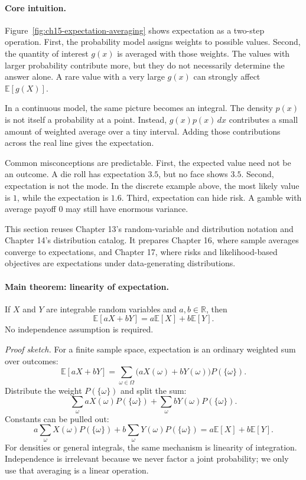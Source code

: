 \paragraph{Core intuition.}
Figure~\ref{fig:ch15-expectation-averaging} shows expectation as a two-step operation. First, the probability model assigns weights to possible values. Second, the quantity of interest \(g(x)\) is averaged with those weights. The values with larger probability contribute more, but they do not necessarily determine the answer alone. A rare value with a very large \(g(x)\) can strongly affect \(\mathbb{E}[g(X)]\).

In a continuous model, the same picture becomes an integral. The density \(p(x)\) is not itself a probability at a point. Instead, \(g(x)p(x)\,dx\) contributes a small amount of weighted average over a tiny interval. Adding those contributions across the real line gives the expectation.

Common misconceptions are predictable. First, the expected value need not be an outcome. A die roll has expectation \(3.5\), but no face shows \(3.5\). Second, expectation is not the mode. In the discrete example above, the most likely value is \(1\), while the expectation is \(1.6\). Third, expectation can hide risk. A gamble with average payoff \(0\) may still have enormous variance.

This section reuses Chapter 13's random-variable and distribution notation and Chapter 14's distribution catalog. It prepares Chapter 16, where sample averages converge to expectations, and Chapter 17, where risks and likelihood-based objectives are expectations under data-generating distributions.

\paragraph{Main theorem: linearity of expectation.}
If \(X\) and \(Y\) are integrable random variables and \(a,b\in\mathbb{R}\), then
\[
\boxed{\mathbb{E}[aX+bY]=a\mathbb{E}[X]+b\mathbb{E}[Y].}
\]
No independence assumption is required.

\emph{Proof sketch.}
For a finite sample space, expectation is an ordinary weighted sum over outcomes:
\[
\mathbb{E}[aX+bY]
=\sum_{\omega\in\Omega}\bigl(aX(\omega)+bY(\omega)\bigr)P(\{\omega\}).
\]
Distribute the weight \(P(\{\omega\})\) and split the sum:
\[
\sum_{\omega}aX(\omega)P(\{\omega\})
+
\sum_{\omega}bY(\omega)P(\{\omega\}).
\]
Constants can be pulled out:
\[
a\sum_{\omega}X(\omega)P(\{\omega\})
+
b\sum_{\omega}Y(\omega)P(\{\omega\})
=a\mathbb{E}[X]+b\mathbb{E}[Y].
\]
For densities or general integrals, the same mechanism is linearity of integration. Independence is irrelevant because we never factor a joint probability; we only use that averaging is a linear operation.

